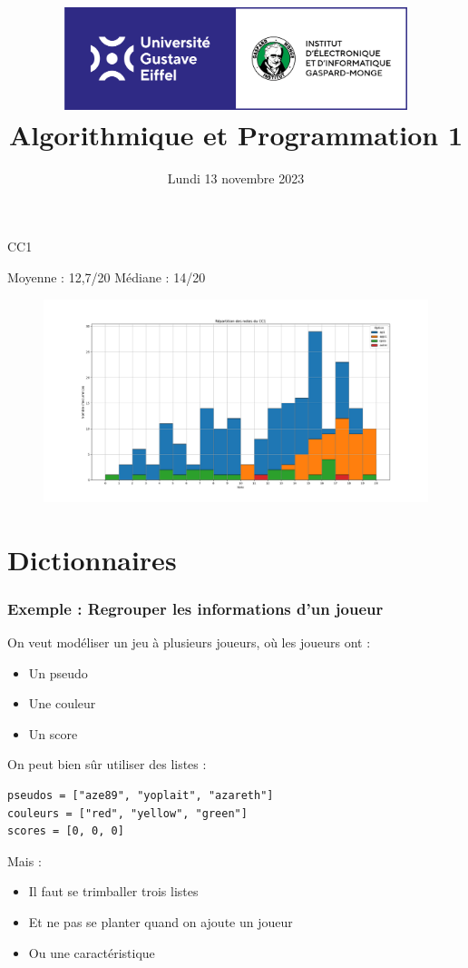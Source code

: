 \documentclass[x11names,svgnames]{beamer}
\author{}
\date{Lundi 13 novembre 2023}
\title{\includegraphics[width=0.75\textwidth]{../../../img/logo-igm.png} \\ Algorithmique et Programmation 1}
\institute{L1 Mathématiques - L1 Informatique \\ Semestre 1}
\begin{document}
\maketitle

\begin{frame}{CC1}

Moyenne : 12,7/20 \qquad Médiane : 14/20

\begin{figure}[ht]
  \centering
\includegraphics[width = \textwidth]{img/Stats_CC1.png}
\end{figure}

\end{frame}




\section{Dictionnaires}

\begin{frame}[fragile]
  \frametitle{Exemple : Regrouper les informations d'un joueur}

  On veut modéliser un jeu à plusieurs joueurs, où les joueurs ont :
  \begin{itemize}
  \item Un pseudo
  \item Une couleur
  \item Un score
  \end{itemize}


  On peut bien sûr utiliser des listes :
  \begin{mdframed}[roundcorner=5pt]
\begin{verbatim}
pseudos = ["aze89", "yoplait", "azareth"]
couleurs = ["red", "yellow", "green"]
scores = [0, 0, 0]
\end{verbatim}
  \end{mdframed}
  \pause
  Mais :
  \begin{itemize}
\item Il faut se trimballer trois listes
\item Et ne pas se planter quand on ajoute un joueur
\item Ou une caractéristique
  \end{itemize}
\end{frame}
\end{document}
